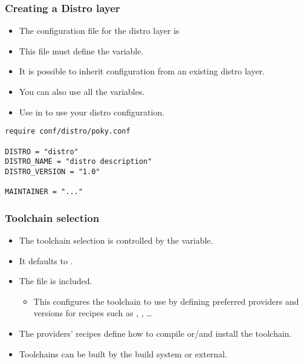 \begin{frame}[fragile]
  \frametitle{Creating a Distro layer}
  \begin{itemize}
    \item The configuration file for the distro layer is
    \item This file must define the  variable.
    \item It is possible to inherit configuration from an existing
      distro layer.
    \item You can also use all the  variables.
    \item Use  in  to use
      your distro configuration.
  \end{itemize}
  \begin{block}{}
    \begin{verbatim}
require conf/distro/poky.conf

DISTRO = "distro"
DISTRO_NAME = "distro description"
DISTRO_VERSION = "1.0"

MAINTAINER = "..."
    \end{verbatim}
  \end{block}
\end{frame}

\begin{frame}
  \frametitle{Toolchain selection}
  \begin{itemize}
    \item The toolchain selection is controlled by the 
      variable.
    \item It defaults to .
    \item The  file is
      included.
    \begin{itemize}
      \item This configures the toolchain to use by defining preferred
        providers and versions for recipes such as ,
        , \dots
    \end{itemize}
    \item The providers' recipes define how to compile or/and install
      the toolchain.
    \item Toolchains can be built by the build system or external.
  \end{itemize}
\end{frame}

